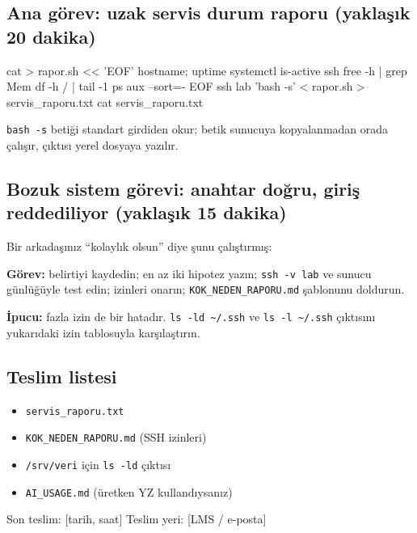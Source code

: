 \documentclass[11pt,a4paper]{article}
\begin{document}
\subsection{Ana görev: uzak servis durum raporu (yaklaşık 20 dakika)}
\begin{kodblok}
cat > rapor.sh << 'EOF'
hostname; uptime
systemctl is-active ssh
free -h | grep Mem
df -h / | tail -1
ps aux --sort=-%
EOF
ssh lab 'bash -s' < rapor.sh > servis_raporu.txt
cat servis_raporu.txt
\end{kodblok}
\texttt{bash -s} betiği standart girdiden okur; betik sunucuya kopyalanmadan orada çalışır, çıktısı yerel dosyaya yazılır.

\subsection{Bozuk sistem görevi: anahtar doğru, giriş reddediliyor (yaklaşık 15 dakika)}
Bir arkadaşınız ``kolaylık olsun'' diye şunu çalıştırmış:
\textbf{Görev:} belirtiyi kaydedin; en az iki hipotez yazın; \texttt{ssh -v lab} ve sunucu günlüğüyle test edin; izinleri onarın; \texttt{KOK\_NEDEN\_RAPORU.md} şablonunu doldurun.

\textbf{İpucu:} fazla izin de bir hatadır. \texttt{ls -ld \textasciitilde/.ssh} ve \texttt{ls -l \textasciitilde/.ssh} çıktısını yukarıdaki izin tablosuyla karşılaştırın.

\subsection{Teslim listesi}
\begin{itemize}
  \item \texttt{servis\_raporu.txt}
  \item \texttt{KOK\_NEDEN\_RAPORU.md} (SSH izinleri)
  \item \texttt{/srv/veri} için \texttt{ls -ld} çıktısı
  \item \texttt{AI\_USAGE.md} (üretken YZ kullandıysanız)
\end{itemize}
Son teslim: [tarih, saat] \quad Teslim yeri: [LMS / e-posta]

\end{document}
